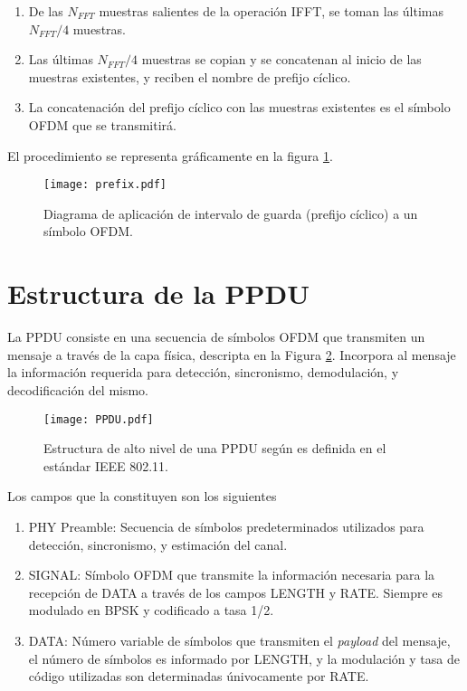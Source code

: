 \begin{enumerate}
    \item De las $N_{FFT}$ muestras salientes de la operación IFFT, se toman las últimas $N_{FFT}/4$ muestras. 
    \item Las últimas $N_{FFT}/4$ muestras se copian y se concatenan al inicio de las muestras existentes, y reciben el nombre de prefijo cíclico. 
    \item La concatenación del prefijo cíclico con las muestras existentes es el símbolo OFDM que se transmitirá.
\end{enumerate}

El procedimiento se representa gráficamente en la figura \ref{fig:prefijo}.\\
\begin{figure}[ht]
    \centering{}\texttt{[image: prefix.pdf]}
    \caption{Diagrama de aplicación de intervalo de guarda (prefijo cíclico) a un símbolo OFDM.\label{fig:prefijo}}  
\end{figure}


\section{Estructura de la PPDU}
\label{S:ch2-ppdu}

La PPDU consiste en una secuencia de símbolos OFDM que transmiten un mensaje a través de la capa física, descripta en la Figura \ref*{fig:ppdu}. Incorpora al mensaje la información requerida para detección, sincronismo, demodulación, y decodificación del mismo.\\
\begin{figure}[ht]
    \centering{}\texttt{[image: PPDU.pdf]}
    \caption{Estructura de alto nivel de una PPDU según es definida en el estándar IEEE 802.11.\cite{ieee}\label{fig:ppdu}}  
\end{figure}

Los campos que la constituyen son los siguientes
\begin{enumerate}
    \item PHY Preamble: Secuencia de símbolos predeterminados utilizados para detección, sincronismo, y estimación del canal.
    \item SIGNAL: Símbolo OFDM que transmite la información necesaria para la recepción de DATA a través de los campos LENGTH y RATE. Siempre es modulado en BPSK y codificado a tasa 1/2.
    \item DATA: Número variable de símbolos que transmiten el \textit{payload} del mensaje, el número de símbolos es informado por LENGTH, y la modulación y tasa de código utilizadas son determinadas únivocamente por RATE.
\end{enumerate}

